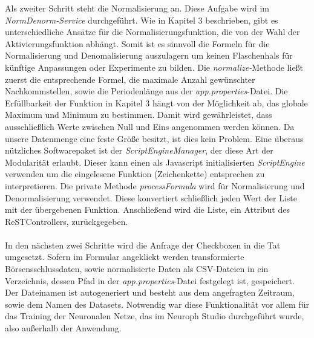 Als zweiter Schritt steht die Normalisierung an. Diese Aufgabe wird im \emph{NormDenorm-Service} durchgeführt. Wie in Kapitel 3 beschrieben, gibt es unterschiedliche Ansätze für die Normalisierungsfunktion, die von der Wahl der Aktivierungsfunktion abhängt. Somit ist es sinnvoll die Formeln für die Normalisierung und Denomalisierung auszulagern um keinen Flaschenhals für künftige Anpassungen oder Experimente zu bilden. Die \emph{normalize-}Methode ließt zuerst die entsprechende Formel, die maximale Anzahl gewünschter Nachkommstellen, sowie die Periodenlänge aus der \emph{app.properties}-Datei. Die Erfüllbarkeit der Funktion in Kapitel 3 hängt von der Möglichkeit ab, das globale Maximum und Minimum zu bestimmen. Damit wird gewährleistet, dass ausschließlich Werte zwischen Null und Eins angenommen werden können. Da unsere Datenmenge eine feste Größe besitzt, ist dies kein Problem. 
Eine überaus nützliches Softwarepaket ist der \emph{ScriptEngineManager}, der diese Art der Modularität erlaubt. Dieser kann einen als Javascript initialisierten \emph{ScriptEngine} verwenden um die eingelesene Funktion (Zeichenkette) entsprechen zu interpretieren. Die private Methode \emph{processFormula} wird für Normalisierung und Denormalisierung verwendet. Diese konvertiert schließlich jeden Wert der Liste mit der übergebenen Funktion. 
Anschließend wird die Liste, ein Attribut des ReSTControllers, zurückgegeben. \\\\

In den nächsten zwei Schritte wird die Anfrage der Checkboxen in die Tat umgesetzt. Sofern im Formular angeklickt werden transformierte Börsensschlussdaten, sowie normalisierte Daten als CSV-Dateien in ein Verzeichnis, dessen Pfad in der \emph{app.properties}-Datei festgelegt ist, gespeichert. Der Dateinamen ist autogeneriert und besteht aus dem angefragten Zeitraum, sowie dem Namen des Datasets. Notwendig war diese Funktionalität vor allem für das Training der Neuronalen Netze, das im Neuroph Studio durchgeführt wurde, also außerhalb der Anwendung.\\

